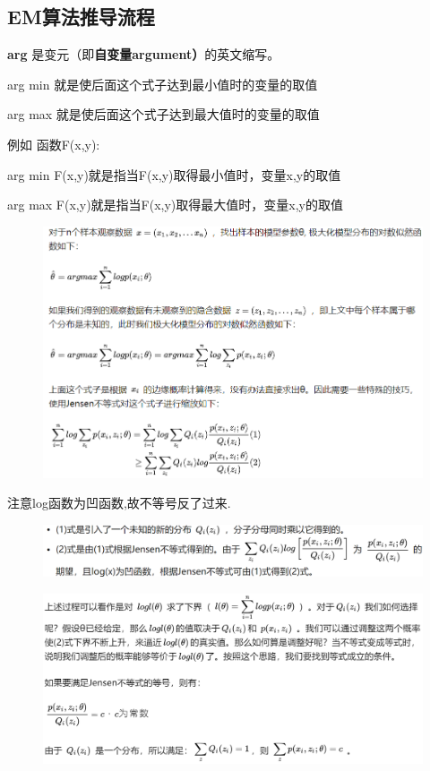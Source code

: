 \documentclass[11pt,a4paper,oneside]{book}
\begin{document}
\subsection{EM算法推导流程}
\begin{tcolorbox}[colback=blue!7!white,colframe=blue!40]
	\textbf{arg}    是变元（即\textbf{自变量argument）}的英文缩写。
	
	arg min 就是使后面这个式子达到最小值时的变量的取值
	
	arg max 就是使后面这个式子达到最大值时的变量的取值
	
	例如 函数F(x,y):
	
	arg  min F(x,y)就是指当F(x,y)取得最小值时，变量x,y的取值
	
	arg  max F(x,y)就是指当F(x,y)取得最大值时，变量x,y的取值
\end{tcolorbox}
\begin{figure}[H]
	\centering
	\includegraphics[width=\textwidth]{18.png}
\end{figure}
注意log函数为凹函数,故不等号反了过来.
\begin{figure}[H]
	\centering
	\includegraphics[width=\textwidth]{19.png}
\end{figure}
\begin{figure}[H]
	\centering
	\includegraphics[width=\textwidth]{20.png}
\end{figure}
\end{document}
